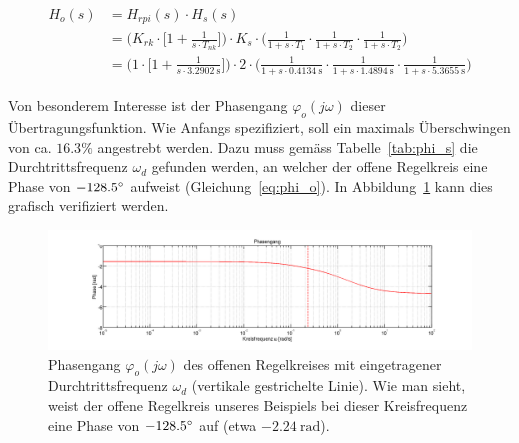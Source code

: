 \begin{gather} \label{eq:pi:h_open}
    \begin{split}
        H_o (s) & = H_{rpi} (s) \cdot H_s (s) \\
            & = \Biggl(
                    K_{rk} \cdot \biggl[ 1 + \frac{1}{s \cdot T_{nk}} \biggr]
                \Biggr)
                \cdot
                K_s
                \cdot
                \Biggl(
                        \frac{1}{1 + s \cdot T_1}
                  \cdot \frac{1}{1 + s \cdot T_2}
                  \cdot \frac{1}{1 + s \cdot T_2}
                \Biggr) \\
            & = \Biggl(
                    1 \cdot \biggl[ 1 + \frac{1}{s \cdot \SI{3.2902}{\second}} \biggr]
                \Biggr)
                \cdot
                2
                \cdot
                \Biggl(
                          \frac{1}{1 + s \cdot \SI{0.4134}{\second}}
                    \cdot \frac{1}{1 + s \cdot \SI{1.4894}{\second}}
                    \cdot \frac{1}{1 + s \cdot \SI{5.3655}{\second}}
                \Biggr)
    \end{split}
\end{gather}


Von  besonderem  Interesse  ist  der  Phasengang  $\varphi_o(j\omega)$  dieser
\"Ubertragungsfunktion. Wie   Anfangs   spezifiziert,    soll   ein   maximals
\"Uberschwingen  von   ca. $16.3\%$  angestrebt  werden. Dazu   muss  gem\"ass
Tabelle~\ref{tab:phi_s}  die Durchtrittsfrequenz  $\omega_d$ gefunden  werden,
an  welcher der  offene  Regelkreis eine  Phase  von $-128.5\degree$  aufweist
(Gleichung~\ref{eq:phi_o}). In   Abbildung~\ref{fig:pi:omega_d}    kann   dies
grafisch verifiziert werden.

\begin{figure}[h! width=\pagewidth]
    \includegraphics[width=\textwidth]{images/piOffenerRegelkreisPhasengang.png}
    \caption{%
        Phasengang   $\varphi_o(j\omega)$   des   offenen   Regelkreises   mit
        eingetragener Durchtrittsfrequenz $\omega_{d}$ (vertikale gestrichelte
        Linie). Wie man  sieht, weist der offene  Regelkreis unseres Beispiels
        bei dieser Kreisfrequenz eine Phase von $-128.5\degree$ auf
        (etwa $\SI{-2.24}{\radian}$).
    }
    \label{fig:pi:omega_d}
\end{figure}

